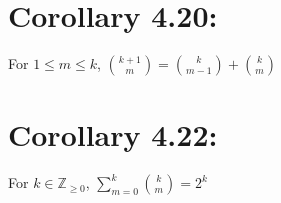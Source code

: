 \section*{Corollary 4.20:}
For $1 \leq m \leq k$,
$\binom{k+1}{m} = \binom{k}{m-1} + \binom{k}{m}$

\section*{Corollary 4.22:}
For $k \in \mathbb{Z}_{\geq 0}$,
$\displaystyle\sum_{m=0}^{k} \binom{k}{m} = 2^k$